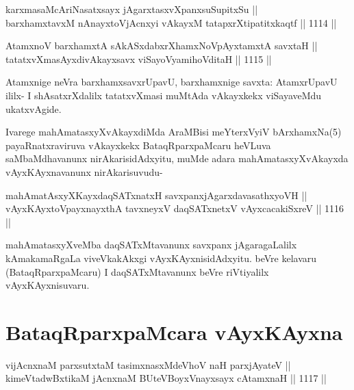 \begin{shl}
karxmasaMcAriNasatxsayx jAgarxtasxvXpanxsuSupitxSu || \\
barxhamxtavxM nAnayxtoV\s jAcnxyi vAkayxM tatapxrXtipatitxkaqtf ||  1114 ||  
\end{shl}


\begin{shl}
AtamxnoV barxhamxtA sAkASxdabxrXhamxNoV\s pAyxtamxtA savxtaH ||  \\
tatatxvXmasAyxdivAkayxsavx viSayoV\s yamihoVditaH ||  1115 || 
\end{shl}

\begin{artha}
Atamxnige neVra barxhamxsavxrUpavU, barxhamxnige savxta: AtamxrUpavU ililx- I shAsatxrXdalilx tatatxvXmasi muMtAda vAkayxkekx viSayaveMdu ukatxvAgide.
\end{artha}

\begin{artha}
Ivarege mahAmatasxyXvAkayxdiMda AraMBisi meYterxVyiV bArxhamxNa(5) payaRnatxraviruva vAkayxkekx BataqRparxpaMcaru heVLuva saMbaMdhavanunx nirAkarisidAdxyitu, muMde adara mahAmatasxyXvAkayxda vAyxKAyxnavanunx nirAkarisuvudu-
\end{artha}

\begin{shl}
mahAmatAsxyXKayxdaqSATxnatxH savxpanxjAgarxdavasathxyoVH || \\
vAyxKAyxtoV\s payxnayxthA tavxneyxV daqSATxnetxV vAyxcacakiSxreV ||  1116 ||  
\end{shl}

\begin{artha}
mahAmatasxyXveMba daqSATxMtavanunx savxpanx jAgaragaLalilx kAmakamaRgaLa viveVkakAkxgi vAyxKAyxnisidAdxyitu. beVre kelavaru (BataqRparxpaMcaru) I daqSATxMtavanunx beVre riVtiyalilx vAyxKAyxnisuvaru.
\end{artha}

\section*{BataqRparxpaMcara vAyxKAyxna}



\begin{shl}
vijAcnxnaM parxsutxtaM tasimxnasxMdeVhoV naH parxjAyateV || \\
kimeVtadwBxtikaM jAcnxnaM BUteVBoyxV\s nayxsayx cA\s \s tamxnaH ||  1117 ||  
\end{shl}

